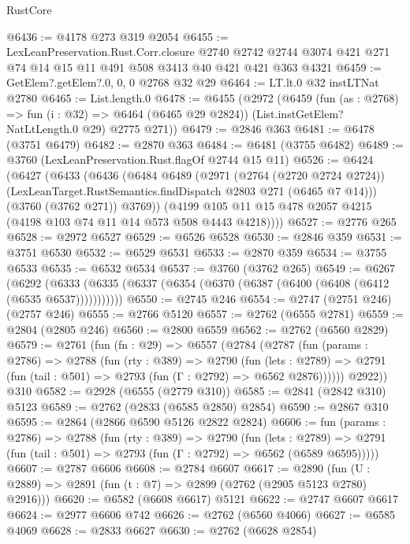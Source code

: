 \begin{lexlean}{RustCore}
\begin{coremodule}
@6436 := @4178 @273 @319 @2054
@6455 := LexLeanPreservation.Rust.Corr.closure
    @2740
    @2742
    @2744
    @3074
    @421
    @271
    @74
    @14
    @15
    @11
    @491
    @508
    @3413
    @40
    @421
    @421
    @363
    @4321
@6459 := GetElem?.getElem?.{0, 0, 0} @2768 @32 @29
@6464 := LT.lt.{0} @32 instLTNat @2780
@6465 := List.length.{0}
@6478 := @6455
    (@2972
      (@6459
        (fun (as : @2768) => fun (i : @32) => @6464 (@6465 @29 @2824))
        (List.instGetElem?NatLtLength.{0} @29)
        @2775
        @271))
@6479 := @2846 @363
@6481 := @6478 (@3751 @6479)
@6482 := @2870 @363
@6484 := @6481 (@3755 @6482)
@6489 := @3760 (LexLeanPreservation.Rust.flagOf @2744 @15 @11)
@6526 := @6424
    (@6427
      (@6433
        (@6436
          (@6484
            @6489
            (@2971
              (@2764 (@2720 @2724 @2724))
              (LexLeanTarget.RustSemantics.findDispatch @2803 @271 (@6465 @7 @14)))
            (@3760 (@3762 @271))
            @3769))
        (@4199 @105 @11 @15 @478 @2057 @4215 (@4198 @103 @74 @11 @14 @573 @508 @4443 @4218))))
@6527 := @2776 @265
@6528 := @2972 @6527
@6529 := @6526 @6528
@6530 := @2846 @359
@6531 := @3751 @6530
@6532 := @6529 @6531
@6533 := @2870 @359
@6534 := @3755 @6533
@6535 := @6532 @6534
@6537 := @3760 (@3762 @265)
@6549 := @6267
    (@6292 (@6333 (@6335 (@6337 (@6354 (@6370 (@6387 (@6400 (@6408 (@6412 (@6535 @6537)))))))))))
@6550 := @2745 @246
@6554 := @2747 (@2751 @246) (@2757 @246)
@6555 := @2766 @5120
@6557 := @2762 (@6555 @2781)
@6559 := @2804 (@2805 @246)
@6560 := @2800 @6559
@6562 := @2762 (@6560 @2829)
@6579 := @2761
    (fun (fn : @29) =>
    @6557
      (@2784
        (@2787
          (fun (params : @2786) =>
          @2788
            (fun (rty : @389) =>
            @2790
              (fun (lets : @2789) =>
              @2791 (fun (tail : @501) => @2793 (fun (Γ : @2792) => @6562 @2876))))))
        @2922))
    @310
@6582 := @2928 (@6555 (@2779 @310))
@6585 := @2841 (@2842 @310) @5123
@6589 := @2762 (@2833 (@6585 @2850) @2854)
@6590 := @2867 @310
@6595 := @2864 (@2866 @6590 @5126 @2822 @2824)
@6606 := fun (params : @2786) =>
  @2788
    (fun (rty : @389) =>
    @2790
      (fun (lets : @2789) =>
      @2791 (fun (tail : @501) => @2793 (fun (Γ : @2792) => @6562 (@6589 @6595)))))
@6607 := @2787 @6606
@6608 := @2784 @6607
@6617 := @2890 (fun (U : @2889) => @2891 (fun (t : @7) => @2899 (@2762 (@2905 @5123 @2780) @2916)))
@6620 := @6582 (@6608 @6617) @5121
@6622 := @2747 @6607 @6617
@6624 := @2977 @6606 @742
@6626 := @2762 (@6560 @4066)
@6627 := @6585 @4069
@6628 := @2833 @6627
@6630 := @2762 (@6628 @2854)

\end{coremodule}
\end{lexlean}
